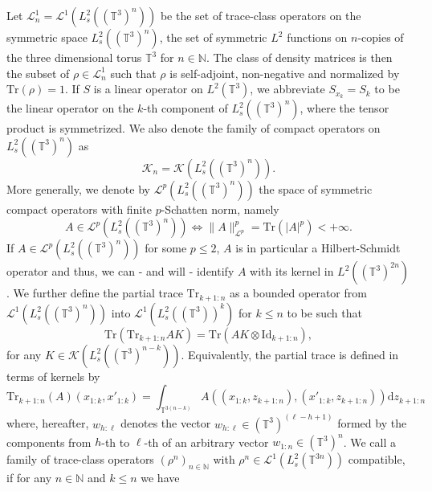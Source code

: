 Let $\mathcal{L}^1_n = \mathcal{L}^1 (L_s^2 ((\mathbb{T}^3)^n))$ be the set of
trace-class operators on the symmetric space $L_s^2 ((\mathbb{T}^3)^n)$, the
set of symmetric $L^2$ functions on $n$-copies of the three dimensional torus
$\mathbb{T}^3$ for $n \in \mathbb{N}$. The class of density matrices
is then the subset of $\rho \in \mathcal{L}^1_n$ such that $\rho$ is
self-adjoint, non-negative and normalized by $\mathrm{Tr} (\rho) = 1$. If $S$ is
a linear operator on $L^2 (\mathbb{T}^3)$, we abbreviate $S_{x_k} = S_k$ to be the
linear operator on the $k$-th component of $L_s^2 ((\mathbb{T}^3)^n)$, where
the tensor product is symmetrized. We also denote the family of compact
operators on $L_s^2 ((\mathbb{T}^3)^n)$ as 
\begin{equation}\label{eq:def-K_n}
\mathcal{K}_n = \mathcal{K} (L_s^2
((\mathbb{T}^3)^n)).
\end{equation}
More generally, we denote by $\mathcal{L}^p (L^2_s ((\mathbb{T}^3)^n))$ the
space of symmetric compact operators with finite $p$-Schatten norm,
namely
\[ A \in \mathcal{L}^p (L^2_s ((\mathbb{T}^3)^n)) \Leftrightarrow \| A
   \|_{\mathcal{L}^p}^p = \mathrm{Tr} (| A |^p) < + \infty . \]
If $A \in \mathcal{L}^p (L^2_s ((\mathbb{T}^3)^n))$ for some $p \leqslant 2$,
$A$ is in particular a Hilbert-Schmidt operator and thus, we can - and will -
identify $A$ with its kernel in $L^2 ((\mathbb{T}^3)^{2 n})$. We further
define the partial trace $\mathrm{Tr}_{k + 1 : n}$ as a bounded operator from
$\mathcal{L}^1 (L^2_s ((\mathbb{T}^3)^n))$ into $\mathcal{L}^1 (L^2_s
((\mathbb{T}^3) )^k)$ for $k \leqslant n$ to be such that
\begin{equation}
  \mathrm{Tr} (\mathrm{Tr}_{k + 1 : n} A K) = \mathrm{Tr} (A K \otimes \mathrm{Id}_{k
  + 1 : n}), \label{eq:def-partialtrace-weak}
\end{equation}
for any $K \in \mathcal{K} (L_s^2 ((\mathbb{T}^3)^{n - k}))$. Equivalently,
the partial trace is defined in terms of kernels by
\[ \mathrm{Tr}_{k + 1 : n} (A) (x_{1 : k}, x'_{1 : k}) = \int_{\mathbb{T}^{3 (n
   - k)}} A ((x_{1 : k}, z_{k + 1 : n}), (x'_{1 : k}, z_{k + 1 : n})) \mathrm{d}
   z_{k + 1 : n} \]
where, hereafter, $w_{h : \ell}$ denotes the vector $w_{h : \ell} \in
(\mathbb{T}^3)^{(\ell - h + 1)}$ formed by the components from $h$-th to
$\ell$-th of an arbitrary vector $w_{1 : n} \in (\mathbb{T}^3)^n$. We call a
family of trace-class operators $(\rho^n)_{n \in \mathbb{N}}$ with $\rho^n \in
\mathcal{L}^1 (L^2_s (\mathbb{T}^{3 n}))$ compatible, if for any $n
\in \mathbb{N}$ and $k \leqslant n$ we have
